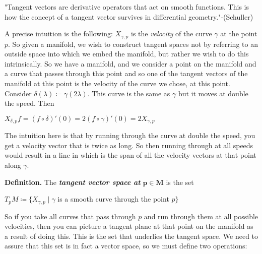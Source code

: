 \documentclass[12pt, a4paper]{article}
\begin{document}
\newpage

"Tangent vectors are derivative operators that act on smooth functions. This is how the concept of a tangent vector survives in differential geometry."-(Schuller)\par

\vspace{4mm}

A precise intuition is the following: $X_{\gamma, p}$ is the \textit{velocity} of the curve $\gamma$ at the point $p$. So given a manifold, we wish to construct tangent spaces not by referring to an outside space into which we embed the manifold, but rather we wish to do this intrinsically. So we have a manifold, and we consider a point on the manifold and a curve that passes through this point and so one of the tangent vectors of the manifold at this point is the velocity of the curve we chose, at this point. Consider $\delta(\lambda)\coloneqq \gamma(2\lambda)$. This curve is the same as $\gamma$ but it moves at double the speed. Then 

\vspace{4mm}

\centerline{$X_{\delta, p}f=(f\circ\delta)'(0)=2(f\circ\gamma)'(0)=2X_{\gamma, p}$}

\vspace{4mm}

The intuition here is that by running through the curve at double the speed, you get a velocity vector that is twice as long. So then running through at all speeds would result in a line in which is the span of all the velocity vectors at that point along $\gamma$.

\vspace{4mm}

\begin{flushleft}
\textbf{Definition.} The \textit{\textbf{tangent vector space at}} $\bm{p\in M}$ is the set\par

\vspace{4mm}

\centerline{$T_pM\coloneqq \{X_{\gamma, p}\mid \gamma$ is a smooth curve through the point $p\}$}

\end{flushleft}



So if you take all curves that pass through $p$ and run through them at all possible velocities, then you can picture a tangent plane at that point on the manifold as a result of doing this. This is the set that underlies the tangent space. We need to assure that this set is in fact a vector space, so we must define two operations:\par
\end{document}
